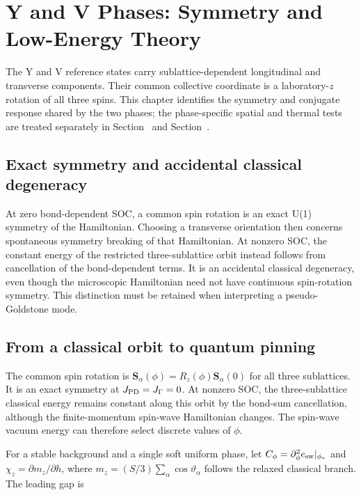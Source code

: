 \clearpage

\section{Y and V Phases: Symmetry and Low-Energy
Theory}\label{sec-nbcp-yv-low-energy}

The Y and V reference states carry sublattice-dependent longitudinal and
transverse components. Their common collective coordinate is a
laboratory-\(z\) rotation of all three spins. This chapter identifies
the symmetry and conjugate response shared by the two phases; the
phase-specific spatial and thermal tests are treated separately in
Section~ and Section~.

\subsection{Exact symmetry and accidental classical
degeneracy}\label{exact-symmetry-and-accidental-classical-degeneracy}

At zero bond-dependent SOC, a common spin rotation is an exact U(1)
symmetry of the Hamiltonian. Choosing a transverse orientation then
concerns spontaneous symmetry breaking of that Hamiltonian. At nonzero
SOC, the constant energy of the restricted three-sublattice orbit
instead follows from cancellation of the bond-dependent terms. It is an
accidental classical degeneracy, even though the microscopic Hamiltonian
need not have continuous spin-rotation symmetry. This distinction must
be retained when interpreting a pseudo-Goldstone mode.

\subsection{From a classical orbit to quantum
pinning}\label{from-a-classical-orbit-to-quantum-pinning}

The common spin rotation is
\(\mathbf S_\alpha(\phi)=R_z(\phi)\mathbf S_\alpha(0)\) for all three
sublattices. It is an exact symmetry at \(J_{\rm PD}=J_\Gamma=0\). At
nonzero SOC, the three-sublattice classical energy remains constant
along this orbit by the bond-sum cancellation, although the
finite-momentum spin-wave Hamiltonian changes. The spin-wave vacuum
energy can therefore select discrete values of \(\phi\).

For a stable background and a single soft uniform phase, let
\(C_\phi=\partial_\phi^2e_{\rm sw}|_{\phi_*}\) and
\(\chi_z=\partial m_z/\partial h\), where
\(m_z=(S/3)\sum_\alpha\cos\vartheta_\alpha\) follows the relaxed
classical branch. The leading gap is

